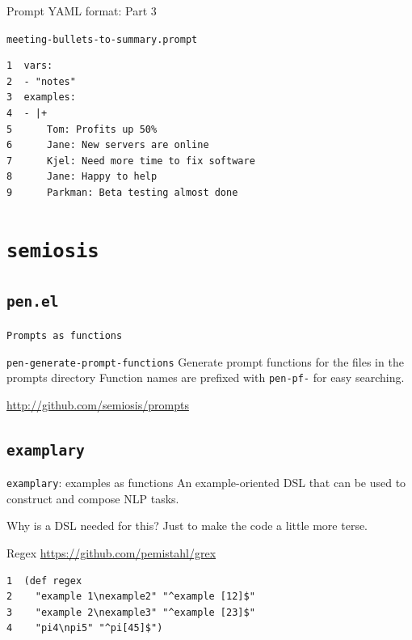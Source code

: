 \documentclass[presentation]{beamer}
\begin{document}
\begin{frame}[label={sec:orgdeb6191},fragile]{Prompt YAML format: Part 3}
 \begin{block}{\texttt{meeting-bullets-to-summary.prompt}}
\begin{verbatim}
1  vars:
2  - "notes"
3  examples:
4  - |+
5      Tom: Profits up 50%
6      Jane: New servers are online
7      Kjel: Need more time to fix software
8      Jane: Happy to help
9      Parkman: Beta testing almost done
\end{verbatim}
\end{block}
\end{frame}

\section{\texttt{semiosis}}
\label{sec:org7c3fbbe}
\subsection{\texttt{pen.el}}
\label{sec:orge303b84}
\begin{frame}[label={sec:org22b3e83},fragile]{\texttt{Prompts as functions}}
 \begin{block}{\texttt{pen-generate-prompt-functions}}
Generate prompt functions for the files in the
prompts directory Function names are prefixed
with \texttt{pen-pf-} for easy searching.

\url{http://github.com/semiosis/prompts}
\end{block}
\end{frame}

\subsection{\texttt{examplary}}
\label{sec:org01f676d}
\begin{frame}[label={sec:orga16da5e},fragile]{\texttt{examplary}: examples as functions}
 An example-oriented DSL that can be used to
construct and compose NLP tasks.

Why is a DSL needed for this? Just to make the
code a little more terse.

\begin{block}{Regex}
\url{https://github.com/pemistahl/grex}

{\footnotesize
\begin{verbatim}
1  (def regex
2    "example 1\nexample2" "^example [12]$"
3    "example 2\nexample3" "^example [23]$"
4    "pi4\npi5" "^pi[45]$")
\end{verbatim}
}
\end{block}
\end{frame}
\end{document}
